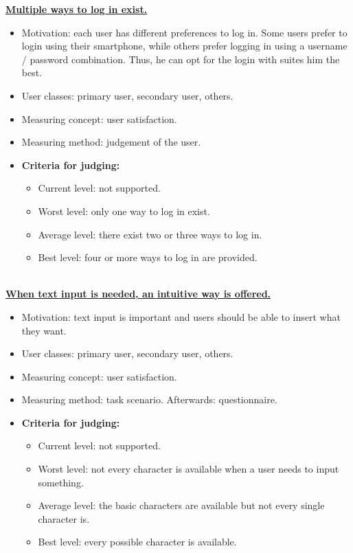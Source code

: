 \documentclass[11pt, a4paper,svglistings]{report}
\begin{document}
\textbf{\underline{Multiple ways to log in exist.}}
\begin{itemize}
\item{Motivation: each user has different preferences to log in. Some users prefer to login using their smartphone, while others prefer logging in using a username / password combination. Thus, he can opt for the login with suites him the best.}
\item{User classes: primary user, secondary user, others.}
\item{Measuring concept: user satisfaction.}
\item{Measuring method: judgement of the user.}
\item{\textbf{Criteria for judging:}}
\begin{itemize}
\item{Current level: not supported.}
\item{Worst level: only one way to log in exist.}
\item{Average level: there exist two or three ways to log in.}
\item{Best level: four or more ways to log in are provided. \\ \\}
\end{itemize}
\end{itemize}
\textbf{\underline{When text input is needed, an intuitive way is offered.}}
\begin{itemize}
\item{Motivation: text input is important and users should be able to insert what they want.}
\item{User classes: primary user, secondary user, others.}
\item{Measuring concept: user satisfaction.}
\item{Measuring method: task scenario. Afterwards: questionnaire.}
\item{\textbf{Criteria for judging:}}
\begin{itemize}
\item{Current level: not supported.}
\item{Worst level: not every character is available when a user needs to input something.}
\item{Average level: the basic characters are available but not every single character is.}
\item{Best level: every possible character is available. \\ \\}
\end{itemize}
\end{itemize}
\end{document}

